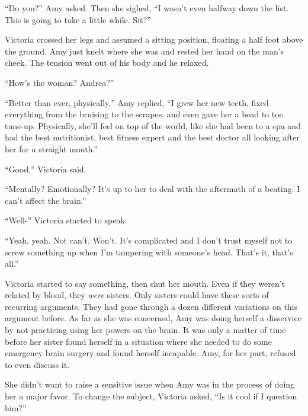 ``Do you?'' Amy asked.  Then she sighed, ``I wasn't even halfway down the list.  This is going to take a little while.  Sit?''



Victoria crossed her legs and assumed a sitting position, floating a half foot above the ground.  Amy just knelt where she was and rested her hand on the man's cheek.  The tension went out of his body and he relaxed.



``How's the woman?  Andrea?''



``Better than ever, physically,'' Amy replied, ``I grew her new teeth, fixed everything from the bruising to the scrapes, and even gave her a head to toe tune-up.  Physically, she'll feel on top of the world, like she had been to a spa and had the best nutritionist, best fitness expert and the best doctor all looking after her for a straight month.''



``Good,'' Victoria said.



``Mentally?  Emotionally?  It's up to her to deal with the aftermath of a beating.  I can't affect the brain.''



``Well-'' Victoria started to speak.



``Yeah, yeah.  Not can't.  Won't.  It's complicated and I don't trust myself not to screw something up when I'm tampering with someone's head.  That's it, that's all.''



Victoria started to say something, then shut her mouth.  Even if they weren't related by blood, they \emph{were} sisters.  Only sisters could have these sorts of recurring arguments.  They had gone through a dozen different variations on this argument before.  As far as she was concerned, Amy was doing herself a disservice by not practicing using her powers on the brain.  It was only a matter of time before her sister found herself in a situation where she needed to do some emergency brain surgery and found herself incapable.  Amy, for her part, refused to even discuss it.



She didn't want to raise a sensitive issue when Amy was in the process of doing her a major favor.  To change the subject, Victoria asked, ``Is it cool if I question him?''



